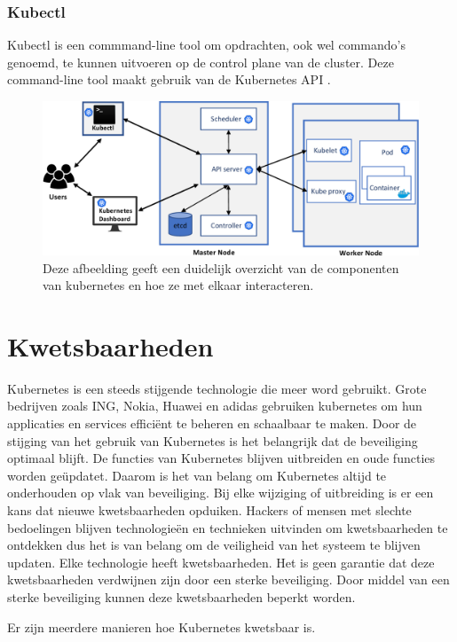 \subsubsection{Kubectl}
Kubectl is een commmand-line tool om opdrachten, ook wel commando's genoemd, te kunnen uitvoeren op de control plane van de cluster.
Deze command-line tool maakt gebruik van de Kubernetes API \autocite{KubernetesDocs-2023}.

\begin{flushleft}
    \begin{figure}[h]
        \includegraphics[width=.49\textwidth]{graphics/3-Figure1-1.png}
        \caption{\label{fig:KubernetesOverview}Deze afbeelding geeft een duidelijk overzicht van de componenten van kubernetes en hoe ze met elkaar interacteren.  \autocite{shamim2020xi}}
    \end{figure} 
\end{flushleft}


\section{Kwetsbaarheden}
Kubernetes is een steeds stijgende technologie die meer word gebruikt. \autocite{KubernetesDocs-2023} Grote bedrijven zoals ING, Nokia, Huawei en adidas gebruiken kubernetes om hun applicaties en services efficiënt te beheren en schaalbaar te maken. Door de stijging van het gebruik van Kubernetes is het belangrijk dat de beveiliging optimaal blijft. De functies van Kubernetes blijven uitbreiden en oude functies worden geüpdatet. Daarom is het van belang om Kubernetes altijd te onderhouden op vlak van beveiliging. Bij elke wijziging of uitbreiding is er een kans dat nieuwe kwetsbaarheden opduiken. Hackers of mensen met slechte bedoelingen blijven technologieën en technieken uitvinden om kwetsbaarheden te ontdekken dus het is van belang om de veiligheid van het systeem te blijven updaten. Elke technologie heeft kwetsbaarheden. Het is geen garantie dat deze kwetsbaarheden verdwijnen zijn door een sterke beveiliging.
Door middel van een sterke beveiliging kunnen deze kwetsbaarheden beperkt worden. 

Er zijn meerdere manieren hoe Kubernetes kwetsbaar is. 






